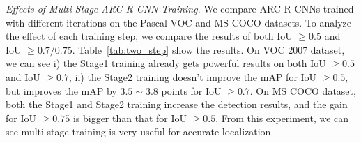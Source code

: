 \documentclass[10pt,twocolumn,letterpaper]{article}
\begin{document}
\textit{Effects of Multi-Stage ARC-R-CNN Training}. \label{sec:2step}
We compare ARC-R-CNNs trained with different iterations on the Pascal VOC and MS COCO datasets. 
To analyze the effect of each training step, we compare the results of both IoU $\ge 0.5$ and IoU $\ge 0.7/0.75$.
Table~\ref{tab:two_step} show the results.
On VOC 2007 dataset, we can see i) the Stage1 training already gets powerful results on both IoU $\ge 0.5$ and IoU $\ge 0.7$, ii) the Stage2 training doesn't improve the mAP for IoU $\ge 0.5$,
 but improves the mAP by $3.5 \sim 3.8$ points for IoU $\ge 0.7$.
On MS COCO dataset, both the Stage1 and Stage2 training increase the detection results, and the gain for IoU $\ge 0.75$ is bigger than that for IoU $\ge 0.5$.
From this experiment, we can see multi-stage training is very useful for accurate localization.


\begin{table} 
\begin{center}
\end{center}
\caption{Comparison of the Stage1 and Stage2 ARC-R-CNNs on mAP with both IoU $\ge 0.5$ and IoU $\ge 0.7/0.75$ on PASCAL VOC 2007 and MS COCO datasets.}
\label{tab:two_step}
\vspace{-2mm}
\end{table}
\end{document}

